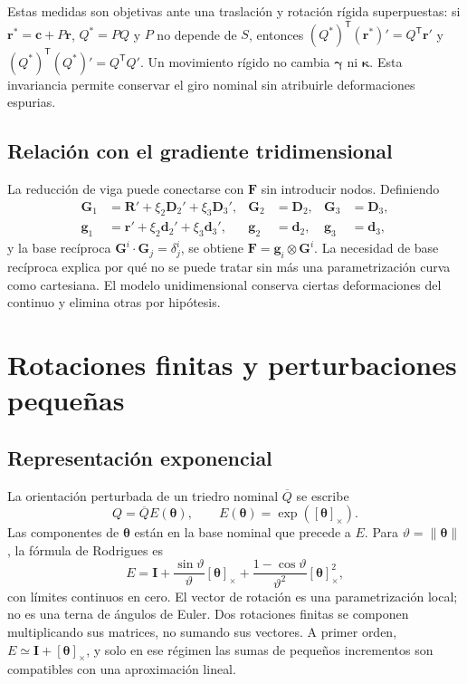 \documentclass[11pt,a4paper,oneside]{report}
\newcommand{\vct}[1]{\bm{#1}}
\newcommand{\ten}[1]{\boldsymbol{#1}}
\newcommand{\Id}{\mathbf I}
\newcommand{\tr}{\mathsf T}
\newcommand{\sk}[1]{[\bm{#1}]_{\times}}
\begin{document}
Estas medidas son objetivas ante una traslación y rotación rígida superpuestas: si $\vct r^*=\vct c+P\vct r$, $Q^*=PQ$ y $P$ no depende de $S$, entonces $(Q^*)^\tr(\vct r^*)'=Q^\tr\vct r'$ y $(Q^*)^\tr(Q^*)'=Q^\tr Q'$. Un movimiento rígido no cambia $\vct\gamma$ ni $\vct\kappa$. Esta invariancia permite conservar el giro nominal sin atribuirle deformaciones espurias.

\subsection{Relación con el gradiente tridimensional}
La reducción de viga puede conectarse con $\ten F$ sin introducir nodos. Definiendo
\begin{align}
 \vct G_1&=\vct R'+\xi_2\vct D_2'+\xi_3\vct D_3',&
 \vct G_2&=\vct D_2,&\vct G_3&=\vct D_3,\\
 \vct g_1&=\vct r'+\xi_2\vct d_2'+\xi_3\vct d_3',&
 \vct g_2&=\vct d_2,&\vct g_3&=\vct d_3,
\end{align}
y la base recíproca $\vct G^i\cdot\vct G_j=\delta^i_j$, se obtiene $\ten F=\vct g_i\otimes\vct G^i$. La necesidad de base recíproca explica por qué no se puede tratar sin más una parametrización curva como cartesiana. El modelo unidimensional conserva ciertas deformaciones del continuo y elimina otras por hipótesis.

\section{Rotaciones finitas y perturbaciones pequeñas}
\subsection{Representación exponencial}
La orientación perturbada de un triedro nominal $\overline Q$ se escribe
\begin{equation}
 Q=\overline Q E(\vct\theta),\qquad E(\vct\theta)=\exp(\sk\theta).
 \label{eq:exprot}
\end{equation}
Las componentes de $\vct\theta$ están en la base nominal que precede a $E$. Para $\vartheta=\|\vct\theta\|$, la fórmula de Rodrigues es
\begin{equation}
 E=\Id+\frac{\sin\vartheta}{\vartheta}\sk\theta
 +\frac{1-\cos\vartheta}{\vartheta^2}\sk\theta^2,
\end{equation}
con límites continuos en cero. El vector de rotación es una parametrización local; no es una terna de ángulos de Euler. Dos rotaciones finitas se componen multiplicando sus matrices, no sumando sus vectores. A primer orden, $E\simeq\Id+\sk\theta$, y solo en ese régimen las sumas de pequeños incrementos son compatibles con una aproximación lineal.
\end{document}
